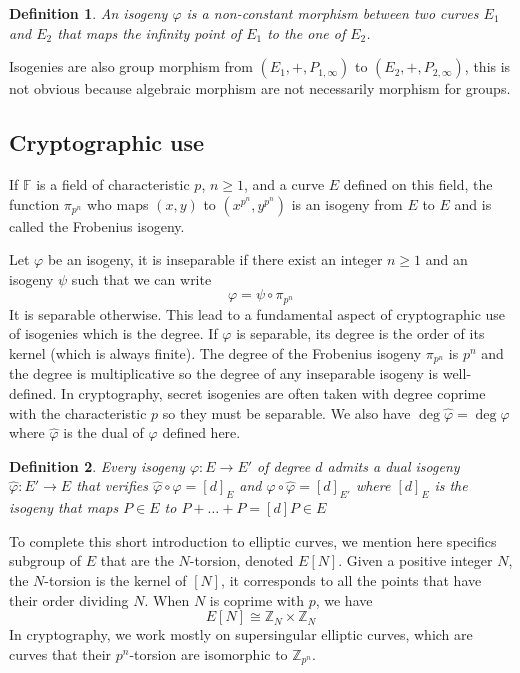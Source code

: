 \documentclass[12pt,a4paper]{article}
\newtheorem{definition}{Definition}
\begin{document}
		\begin{definition}
			An isogeny $\varphi$ is a non-constant morphism between two curves $E_1$ and $E_2$ that maps the
			infinity point of $E_1$ to the one of $E_2$.
		\end{definition}
		Isogenies are also group morphism from $(E_1,+,P_{1,\infty})$ to $(E_2,+,P_{2,\infty})$, this is not
		obvious because algebraic morphism are not necessarily morphism for groups.

		\subsection{Cryptographic use}

		If $\mathbb F$ is a field of characteristic $p$, $n\geq 1$, and a curve $E$ defined on
		this field, the function $\pi_{p^n}$ 
		who maps $(x,y)$ to $(x^{p^n},y^{p^n})$ is an isogeny from $E$ to $E$ and is called the Frobenius
		isogeny.

		Let $\varphi$ be an isogeny, it is inseparable if there exist an integer $n\geq 1$ and an isogeny
		$\psi$ such that we can write \[
			\varphi = \psi\circ\pi_{p^n}
		\] 
		It is separable otherwise. This lead to a fundamental aspect of cryptographic use of isogenies which
		is the degree. If $\varphi$ is separable, its degree is the order of its kernel (which is always
		finite). The degree of the Frobenius isogeny $\pi_{p^n}$ is $p^n$ and the degree is multiplicative so
		the degree of any inseparable isogeny is well-defined. In cryptography, secret isogenies are often
		taken with degree coprime with the characteristic $p$ so they must be separable.
		We also have $\deg\widehat\varphi=\deg\varphi$ where $\widehat\varphi$ is the dual of $\varphi$
		defined here.

		\begin{definition}
			Every isogeny $\varphi:E\to E'$ of degree $d$ admits a dual isogeny $\widehat\varphi:E'\to E$
			that verifies $\widehat\varphi\circ\varphi=[d]_E$ and $\varphi\circ\widehat\varphi=[d]_{E'}$ where
			$[d]_E$ is the isogeny that maps $P\in E$ to $P+\dots+P=[d]P\in E$ 
		\end{definition}

		To complete this short introduction to elliptic curves, we mention here specifics subgroup of $E$
		that are the $N$-torsion, denoted $E[N]$. Given a positive integer $N$, the $N$-torsion is the kernel
		of $[N]$, it corresponds to all the points that have their order dividing $N$. When $N$ is coprime
		with $p$, we have \[
			E[N]\cong \mathbb Z_N \times \mathbb Z_N
		\] 
		In cryptography, we work mostly on supersingular elliptic curves, which are curves that their
		$p^n$-torsion are isomorphic to $\mathbb Z_{p^n}$.
\end{document}
